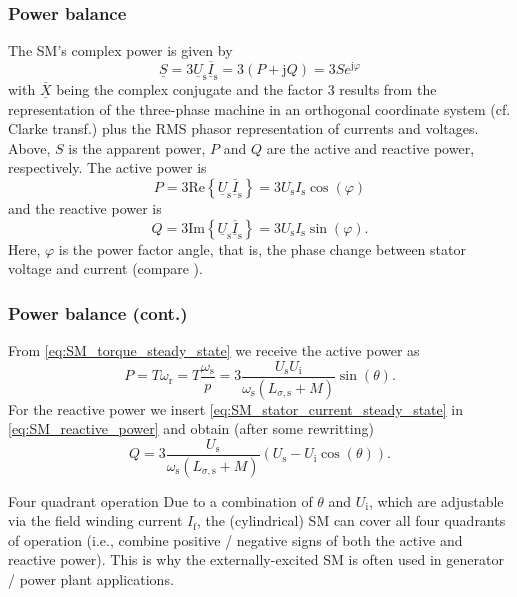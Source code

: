 \begin{frame}
	\frametitle{Power balance} 
	The SM's complex power is given by 
	\begin{equation}
			\underline{S}= 3\underline{U}_\mathrm{s} \overline{\underline{I}}_\mathrm{s} =  3(P + \mathrm{j}Q) = 3S e^{\mathrm{j}\varphi} 
	\end{equation}
	with $\overline{\underline{X}}$ being the complex conjugate and the factor $3$ results from the representation of the three-phase machine in an orthogonal coordinate system (cf. Clarke transf.) plus the RMS phasor representation of currents and voltages. \pause Above, $S$ is the apparent power, $P$ and $Q$ are the active and reactive power, respectively. \pause The active power is
	\begin{equation}
		P = 3\mathrm{Re}\left\{ \underline{U}_\mathrm{s} \overline{\underline{I}}_\mathrm{s}\right\} = 3 U_\mathrm{s} I_\mathrm{s} \cos(\varphi)
	\end{equation}
	\pause
	and the reactive power is
	\begin{equation}
		Q = 3\mathrm{Im}\left\{\underline{U}_\mathrm{s} \overline{\underline{I}}_\mathrm{s}\right\} = 3 U_\mathrm{s} I_\mathrm{s} \sin(\varphi).
		\label{eq:SM_reactive_power}
	\end{equation}
	\pause
	Here, $\varphi$ is the power factor angle, that is, the phase change between stator voltage and current (compare ). 
\end{frame}

\begin{frame}
	\frametitle{Power balance (cont.)} 
	From \eqref{eq:SM_torque_steady_state} we receive the active power as
	\begin{equation}
		P = T \omega_\mathrm{r} = T \frac{\omega_\mathrm{s}}{p} = 3 \frac{U_\mathrm{s} U_\mathrm{i}}{\omega_\mathrm{s} \left(L_{\sigma,\mathrm{s}} + M\right)}  \sin(\theta).
	\end{equation} 
	\pause
	For the reactive power we insert \eqref{eq:SM_stator_current_steady_state} in \eqref{eq:SM_reactive_power} and obtain (after some rewritting)
	\begin{equation}
		Q = 3 \frac{U_\mathrm{s}}{\omega_\mathrm{s} \left(L_{\sigma,\mathrm{s}} + M\right)} \left(U_\mathrm{s} - U_\mathrm{i} \cos(\theta) \right).
	\end{equation}
	\pause
	\begin{varblock}{Four quadrant operation}
		Due to a combination of $\theta$ and $U_\mathrm{i}$, which are adjustable via the field winding current $I_\mathrm{f}$, the (cylindrical) SM can cover all four quadrants of operation (i.e., combine positive / negative signs of both the active and reactive power). This is why the externally-excited SM is often used in generator / power plant applications. 
	\end{varblock}
\end{frame}

